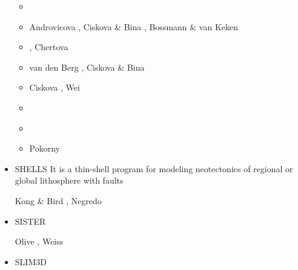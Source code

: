 \begin{itemize}
\begin{scriptsize}
\begin{itemize}
\item[\twothousandtwelve] \cite{besy12}\cite{beva12}\cite{chgv12}\cite{vakn12}
\item[\twothousandthirteen] Androvicova \etal \cite{ancv13}, Ciskova \& Bina \cite{cibi13}, 
                            Bossmann \& van Keken \cite{bova13}
\item[\twothousandfourteen] \cite{chsg14}\cite{mova14}, Chertova \etal \cite{chsv14}
\item[\twothousandfifteen] van den Berg \etal \cite{vasy15}, Ciskova \& Bina \cite{cibi15}
\item[\twothousandseventeen] Ciskova \etal \cite{civj17}, Wei \etal \cite{wewv17}
\item[\twothousandeighteen] \cite{spcv18}\cite{chss18}
\item[\twothousandnineteen] \cite{zhdv19}\cite{vayu19}\cite{casv19}\cite{vaws19}\cite{cibi19}
\item[\twothousandtwentyone] Pokorny \etal \cite{pocv21}
\end{itemize}
\end{scriptsize}

\item {\codefont SHELLS} 
It is a thin-shell program for modeling neotectonics of
regional or global lithosphere with faults

\begin{scriptsize}
Kong \& Bird \cite{kobi95}, Negredo \etal \cite{nebs02}
\end{scriptsize}

\item {\codefont SISTER} 

\begin{scriptsize}
Olive \etal \cite{olbm16}, Weiss \etal \cite{weib18}
\end{scriptsize}

\item {\codefont SLIM3D} 

{\small
\noindent
\cite{poso08}
\cite{qusp10}
\cite{brps12}
\cite{brps13}
\cite{brau13}
\cite{brun14}
\cite{hebr14}
\cite{kobf14}
\cite{clbq15}
\cite{brcr17}
\cite{basq18}\cite{osss18}\cite{osss18b}
}


\end{itemize}
